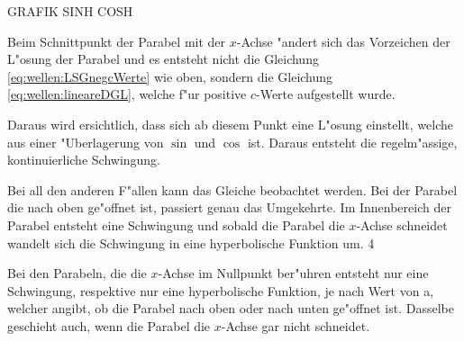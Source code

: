 GRAFIK SINH COSH

Beim Schnittpunkt der Parabel mit der $x$-Achse "andert sich das Vorzeichen der 
L"osung der Parabel und es entsteht nicht die Gleichung 
\ref{eq:wellen:LSGnegcWerte} wie oben, sondern die Gleichung 
\ref{eq:wellen:lineareDGL}, welche f"ur positive $c$-Werte aufgestellt wurde. 

Daraus wird ersichtlich, dass sich ab diesem Punkt eine L"osung einstellt, 
welche aus einer "Uberlagerung von $\sin$ und $\cos$ ist. Daraus entsteht die 
regelm"assige, kontinuierliche Schwingung. 


Bei all den anderen F"allen kann das Gleiche beobachtet werden. Bei der Parabel 
die nach oben ge"offnet ist, passiert genau das Umgekehrte. Im Innenbereich der 
Parabel entsteht eine Schwingung und sobald die Parabel die $x$-Achse schneidet 
wandelt sich die Schwingung in eine hyperbolische Funktion um. 4

Bei den Parabeln, die die $x$-Achse im Nullpunkt ber"uhren entsteht nur eine 
Schwingung, respektive nur eine hyperbolische Funktion, je nach Wert von a, 
welcher angibt, ob die Parabel nach oben oder nach unten ge"offnet ist. 
Dasselbe geschieht auch, wenn die Parabel die $x$-Achse gar nicht schneidet. 